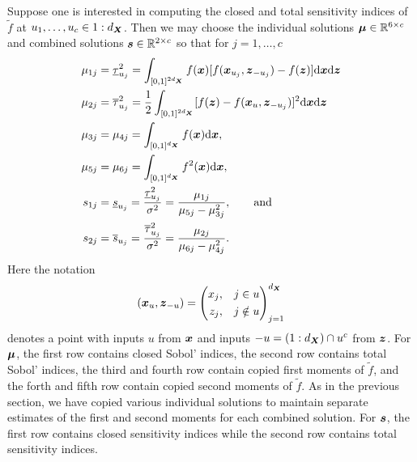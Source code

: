 \documentclass{article}[12pt]
\begin{document}
Suppose one is interested in computing the closed and total sensitivity indices of $\tilde{f}$ at $u_1,\dots,u_c \in 1:d_{\boldsymbol{X}}$.  Then we may choose the individual solutions $\boldsymbol{\mu} \in \mathbb{R}^{6 \times c}$ and combined solutions $\boldsymbol{s} \in \mathbb{R}^{2 \times c}$ so that for $j=1,\dots,c$
\begin{align*}
    \mu_{1j} &= \underline{\tau}_{u_j}^2 = \int_{[0,1]^{2d_{\boldsymbol{X}}}} f(\boldsymbol{x})[f(\boldsymbol{x}_{u_j},\boldsymbol{z}_{-{u_j}})-f(\boldsymbol{z})]\mathrm{d}\boldsymbol{x}\mathrm{d}\boldsymbol{z} \\
    \mu_{2j} &= \overline{\tau}_{u_j}^2 = \frac{1}{2}\int_{[0,1]^{2d_{\boldsymbol{X}}}} [f(\boldsymbol{z})-f(\boldsymbol{x}_u,\boldsymbol{z}_{-{u_j}})]^2\mathrm{d}\boldsymbol{x}\mathrm{d}\boldsymbol{z} \\
    \mu_{3j} &= \mu_{4j} = \int_{[0,1]^{d_{\boldsymbol{X}}}} f(\boldsymbol{x})\mathrm{d}\boldsymbol{x}, \\
    \mu_{5j} &= \mu_{6j} = \int_{[0,1]^{d_{\boldsymbol{X}}}} f^2(\boldsymbol{x})\mathrm{d}\boldsymbol{x}, \\
    s_{1j} &= \underline{s}_{u_j} = \frac{\underline{\tau}_{u_j}^2}{\sigma^2} = \frac{\mu_{1j}}{\mu_{5j}-\mu_{3j}^2}, \qquad \text{and} \\
    s_{2j} &= \overline{s}_{u_j} = \frac{\overline{\tau}_{u_j}^2}{\sigma^2} = \frac{\mu_{2j}}{\mu_{6j}-\mu_{4j}^2}.  
\end{align*}
Here the notation
\begin{equation}
    (\boldsymbol{x}_{u},\boldsymbol{z}_{-u}) = \left(\begin{aligned}x_{j}, \quad & j \in u \\ z_{j}, \quad & j \notin u \end{aligned}\right)_{j=1}^{d_{\boldsymbol{X}}}
\end{equation}
denotes a point with inputs $u$ from $\boldsymbol{x}$ and inputs $-u=(1:d_{\boldsymbol{X}})\cap u^c$ from $\boldsymbol{z}$.
For $\boldsymbol{\mu}$, the first row contains closed Sobol' indices, the second row contains total Sobol' indices, the third and fourth row contain copied first moments of $\tilde{f}$, and the forth and fifth row contain copied second moments of $\tilde{f}$. As in the previous section, we have copied various individual solutions to maintain separate estimates of the first and second moments for each combined solution. For $\boldsymbol{s}$, the first row contains closed sensitivity indices while the second row contains total sensitivity indices. 
\end{document}

